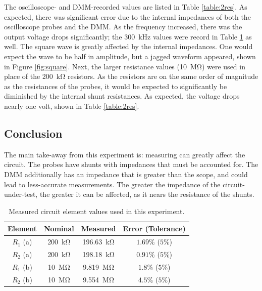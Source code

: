 \documentclass{report}
\begin{document}
The oscilloscope- and DMM-recorded values are listed in Table \ref{table:2res}. As expected, there was significant error due to the internal impedances of both the oscilloscope probes and the DMM. As the frequency increased, there was the output voltage drops significantly; the \SI{300}{\kHz} values were record in Table \ref{table:2actual} as well. The square wave is greatly affected by the internal impedances. One would expect the wave to be half in amplitude, but a jagged waveform appeared, shown in Figure \ref{fig:square}. Next, the larger resistance values (\SI{10}{\mega\ohm}) were used in place of the \SI{200}{\kohm} resistors. As the resistors are on the same order of magnitude as the resistances of the probes, it would be expected to significantly be diminished by the internal shunt resistances. As expected, the voltage drops nearly one volt, shown in Table \ref{table:2res}.

\subsection{Conclusion}
The main take-away from this experiment is: measuring can greatly affect the circuit. The probes have shunts with impedances that must be accounted for. The DMM additionally has an impedance that is greater than the scope, and could lead to less-accurate measurements. The greater the impedance of the circuit-under-test, the greater it can be affected, as it nears the resistance of the shunts.

\begin{table}[h]
	\centering
	\caption{Measured circuit element values used in this experiment.}
	\begin{threeparttable}
		\label{table:2actual}
		\begin{tabular}{cccc}
			\toprule
			Element & Nominal & Measured & Error (Tolerance) \\
			\midrule
			$R_1$ (a) & \SI{200}{\kohm} & \SI{196.63}{\kohm} & $1.69\%$ ($5\%$) \\
			$R_2$ (a) & \SI{200}{\kohm} & \SI{198.18}{\kohm} & $0.91\%$ ($5\%$) \\
			\midrule
			$R_1$ (b) & \SI{10}{\mega\ohm} & \SI{9.819}{\mega\ohm} & $1.8\%$ ($5\%$) \\
			$R_2$ (b) & \SI{10}{\mega\ohm} & \SI{9.554}{\mega\ohm} & $4.5\%$ ($5\%$) \\
			\bottomrule
		\end{tabular}
	\end{threeparttable}
\end{table}
\end{document}
